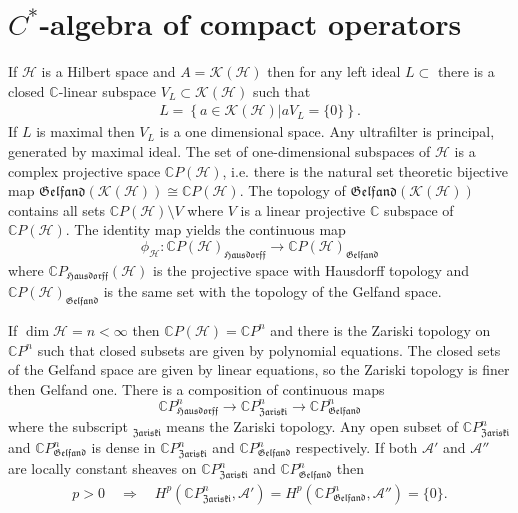 \documentclass{beamer}
\theoremstyle{plain}
\newcommand{\bean}{\begin{eqnarray*}}
\newcommand{\eean}{\end{eqnarray*}}
\newcommand{\C}{\mathbb{C}}
\newcommand{\K}{\mathcal{K}}
\newcommand{\sH}{\mathcal{H}}       %
\begin{document}
\section{$C^*$-algebra of compact operators}
\begin{frame}
If $\sH$ is a Hilbert space and $A = \K\left(\sH \right)$ then for any  left ideal $L\subset $ there is a closed $\C$-linear subspace $V_L \subset \K\left(\sH \right)$ such that
\bean
L = \left\{\left.a \in \K\left(\sH \right)\right| a V_L = \{0\}\right\}.
\eean
If $L$ is maximal then $V_L$ is a one dimensional space. Any ultrafilter is principal, generated by maximal ideal. The set of one-dimensional subspaces of $\sH$ is a complex projective space  $\C P\left(\sH \right)$, i.e. there is the natural set theoretic bijective map  $\mathfrak{Gelfand}\left(\K\left(\sH \right) \right)\cong  \C P\left(\sH \right)$. The topology  of $\mathfrak{Gelfand}\left(\K\left(\sH \right)\right) $ contains all sets $\C P\left(\sH \right) \setminus V$ where $V$ is a linear projective  $\C$ subspace of  $\C P\left(\sH \right)$. The identity map yields the  continuous map 
$$
\phi_{\sH} : \C P\left(\sH \right)_{\mathfrak{Hausdorff}}\to \C P\left(\sH \right)_{\mathfrak{Gelfand}}
$$
where $\C P_{\mathfrak{Hausdorff}}\left(\sH \right) $ is the projective  space with   Hausdorff  topology and  $\C P\left(\sH \right)_{\mathfrak{Gelfand}}$ is the same set  with the topology of the Gelfand space.
\end{frame}
\begin{frame}
If $\dim \sH = n < \infty$  then $\C P\left(\sH \right)= \C P^n$ and there is the \alert{Zariski topology} on $ \C P^n$ such that closed subsets are given by polynomial equations. The closed sets of the Gelfand space are given by linear equations, so the Zariski topology is finer then Gelfand one.
There is a composition of continuous maps
$$
\C P^n_{\mathfrak{Hausdorff}}\to \C P^n_{\mathfrak{Zariski}}\to \C P^n_{\mathfrak{Gelfand}}
$$
where the subscript $_{\mathfrak{Zariski}}$ means the Zariski topology. Any open subset of $\C P^n_{\mathfrak{Zariski}}$ and $\C P^n_{\mathfrak{Gelfand}}$ is dense in $\C P^n_{\mathfrak{Zariski}}$ and $\C P^n_{\mathfrak{Gelfand}}$ respectively. If both $\mathscr A'$ and $\mathscr A''$ are locally constant sheaves on $\C P^n_{\mathfrak{Zariski}}$ and $\C P^n_{\mathfrak{Gelfand}}$ then
\bean
p > 0 \quad \Rightarrow\quad  H^p\left( \C P^n_{\mathfrak{Zariski}}, \mathscr A'\right) = H^p\left( \C P^n_{\mathfrak{Gelfand}}, \mathscr A''\right) = \{0\}.
\eean

\end{frame}
\end{document}
